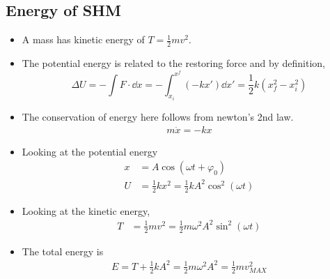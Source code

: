\documentclass[a4paper]{article}
\numberwithin{equation}{section}
\begin{document}
\subsection{Energy of SHM}
\begin{itemize}
    \item A mass has kinetic energy of $T=\frac{1}{2}mv^2$.
    \item The potential energy is related to the restoring force and by definition,
    \begin{equation}
        \Delta U=-\int F\cdot\dd x=-\int_{x_i}^{x^f}(-kx')\dd x'=\frac{1}{2}k(x_f^2-x_i^2)
    \end{equation}
    \item The conservation of energy here follows from newton's 2nd law.
    \begin{align}
        m\ddot x=-kx %
    \end{align}
    \item Looking at the potential energy
    \begin{align}
        x&=A\cos(\omega t+\varphi_0)\\
        U&=\frac{1}{2}kx^2=\frac{1}{2}kA^2\cos^2(\omega t)
    \end{align}
    \item Looking at the kinetic energy,
    \begin{align}
        T&=\frac{1}{2}mv^2=\frac{1}{2}m\omega^2A^2\sin^2(\omega t)
    \end{align}
    \item The total energy is
    \begin{align}
        E=T+\frac{1}{2}kA^2=\frac{1}{2}m\omega^2A^2=\frac{1}{2}mv_{MAX}^2
    \end{align}
\end{itemize}
\end{document}
